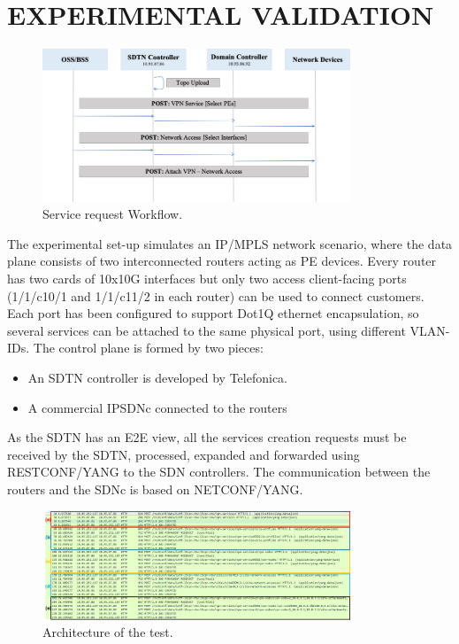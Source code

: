 \documentclass[conference]{IEEEtran}
\begin{document}
\section{EXPERIMENTAL VALIDATION}

\begin{figure}[htb]
\centerline{\includegraphics[width=9.2cm,angle=0]{WORKFLOW.png}}
\caption{Service request Workflow.}
\label{fig2}
\end{figure}

The experimental set-up simulates an IP/MPLS network scenario, where the data plane consists of two interconnected routers acting as PE devices. Every router has two cards of 10x10G interfaces but only two access client-facing ports (1/1/c10/1 and 1/1/c11/2 in each router) can be used to connect customers. Each port has been configured to support Dot1Q ethernet encapsulation, so several services can be attached to the same physical port, using different VLAN-IDs. The control plane is formed by two pieces:
\begin{itemize}
    \item An SDTN controller is developed by Telefonica. 
    \item A commercial IPSDNc connected to the routers
\end{itemize}
As the SDTN has an E2E view, all the services creation requests must be received by the SDTN, processed, expanded and forwarded using RESTCONF/YANG to the SDN controllers. The communication between the routers and the SDNc is based on NETCONF/YANG. 

\begin{figure}[tb]
\centerline{\includegraphics[width=9.2cm,angle=0]{TRACES.png}}
\caption{Architecture of the test.}
\label{fig1}
\end{figure}
\end{document}
